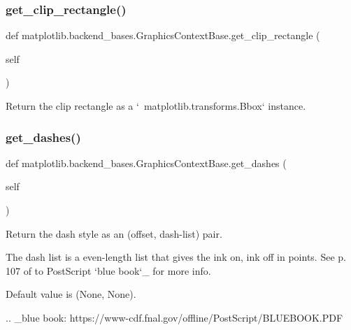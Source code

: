 \subsubsection{\texorpdfstring{get\+\_\+clip\+\_\+rectangle()}{get\_clip\_rectangle()}}
{\footnotesize\ttfamily def matplotlib.\+backend\+\_\+bases.\+Graphics\+Context\+Base.\+get\+\_\+clip\+\_\+rectangle (\begin{DoxyParamCaption}\item[{}]{self }\end{DoxyParamCaption})}

\begin{DoxyVerb}Return the clip rectangle as a `~matplotlib.transforms.Bbox` instance.
\end{DoxyVerb}
 \mbox{\label{classmatplotlib_1_1backend__bases_1_1GraphicsContextBase_a6ede5ae97852025e120170a7ad5023a3}} 
\subsubsection{\texorpdfstring{get\+\_\+dashes()}{get\_dashes()}}
{\footnotesize\ttfamily def matplotlib.\+backend\+\_\+bases.\+Graphics\+Context\+Base.\+get\+\_\+dashes (\begin{DoxyParamCaption}\item[{}]{self }\end{DoxyParamCaption})}

\begin{DoxyVerb}Return the dash style as an (offset, dash-list) pair.

The dash list is a even-length list that gives the ink on, ink off in
points.  See p. 107 of to PostScript `blue book`_ for more info.

Default value is (None, None).

.. _blue book: https://www-cdf.fnal.gov/offline/PostScript/BLUEBOOK.PDF
\end{DoxyVerb}
 \mbox{\label{classmatplotlib_1_1backend__bases_1_1GraphicsContextBase_a719e6ad65c10d653c2c21c30631239e7}} 
